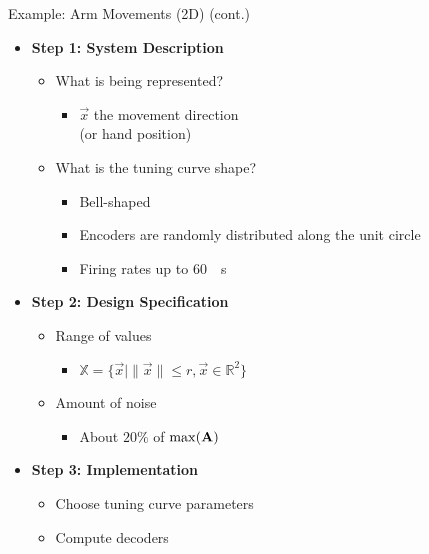 \documentclass[handout,aspectratio=169]{beamer}
\begin{document}
\begin{frame}{Example: Arm Movements (2D) (cont.)}
	\begin{multicols}{2}
		\begin{itemize}
			\setlength{\itemsep}{0.5cm}
			\item \textbf{Step 1: System Description}
			\begin{itemize}
				\setlength{\itemsep}{0.5cm}
				\item What is being represented?
				\begin{itemize}
					\setlength{\itemsep}{0.25cm}
					\item $\vec x$ the movement direction\\(or hand position)
				\end{itemize}
				\item What is the tuning curve shape?
				\begin{itemize}
					\setlength{\itemsep}{0.25cm}
					\item Bell-shaped
					\item Encoders are randomly distributed along the unit circle
					\item Firing rates up to \SI{60}{\per\second}
				\end{itemize}
			\end{itemize}
			\columnbreak
			\item \textbf{Step 2: Design Specification}
			\begin{itemize}
				\setlength{\itemsep}{0.25cm}
				\item Range of values
				\begin{itemize}
					\item $\mathbb{X} = \{\vec x \mid \|\vec x\| \leq r, \vec x \in \mathbb{R}^2 \}$
				\end{itemize}
				\item Amount of noise
				\begin{itemize}
					\setlength{\itemsep}{0.25cm}
					\item About $20\%$ of $\max({\mathbf{A}})$
				\end{itemize}
			\end{itemize}
			\item \textbf{Step 3: Implementation}
			\begin{itemize}
				\setlength{\itemsep}{0.25cm}
				\item Choose tuning curve parameters
				\item Compute decoders
			\end{itemize}
		\end{itemize}
	\end{multicols}
\end{frame}
\end{document}
